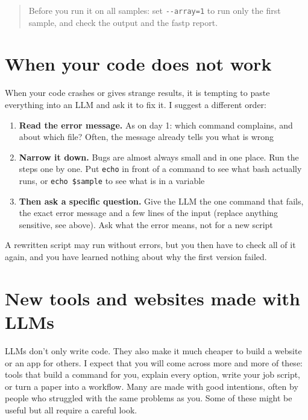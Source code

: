 \documentclass[
  letterpaper,
  DIV=11,
  numbers=noendperiod]{scrreprt}
\providecommand{\tightlist}{%
  \setlength{\itemsep}{0pt}\setlength{\parskip}{0pt}}
\begin{document}
\begin{tcolorbox}
\begin{quote}
Before you run it on all samples: set \texttt{-\/-array=1} to run only
the first sample, and check the output and the fastp report.
\end{quote}

\end{tcolorbox}

\section{When your code does not
work}\label{when-your-code-does-not-work}

When your code crashes or gives strange results, it is tempting to paste
everything into an LLM and ask it to fix it. I suggest a different
order:

\begin{enumerate}
\def\labelenumi{\arabic{enumi}.}
\tightlist
\item
  \textbf{Read the error message.} As on day 1: which command complains,
  and about which file? Often, the message already tells you what is
  wrong
\item
  \textbf{Narrow it down.} Bugs are almost always small and in one
  place. Run the steps one by one. Put \texttt{echo} in front of a
  command to see what bash actually runs, or \texttt{echo\ \$sample} to
  see what is in a variable
\item
  \textbf{Then ask a specific question.} Give the LLM the one command
  that fails, the exact error message and a few lines of the input
  (replace anything sensitive, see above). Ask what the error means, not
  for a new script
\end{enumerate}

A rewritten script may run without errors, but you then have to check
all of it again, and you have learned nothing about why the first
version failed.

\section{New tools and websites made with
LLMs}\label{new-tools-and-websites-made-with-llms}

LLMs don't only write code. They also make it much cheaper to build a
website or an app for others. I expect that you will come across more
and more of these: tools that build a command for you, explain every
option, write your job script, or turn a paper into a workflow. Many are
made with good intentions, often by people who struggled with the same
problems as you. Some of these might be useful but all require a careful
look.
\end{document}

